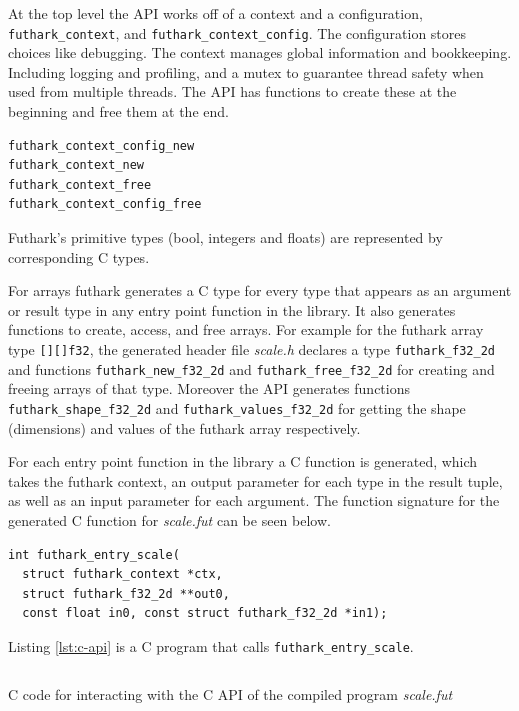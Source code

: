 \documentclass[11pt]{book}
\begin{document}
At the top level the API works off of a context and a configuration, \texttt{futhark\_context}, and \texttt{futhark\_context\_config}. The configuration stores choices like debugging. The context manages global information and bookkeeping. Including logging and profiling, and a mutex to guarantee thread safety when used from multiple threads. The API has functions to create these at the beginning and free them at the end. 
\begin{verbatim}
futhark_context_config_new
futhark_context_new
futhark_context_free
futhark_context_config_free
\end{verbatim}

Futhark's primitive types (bool, integers and floats) are represented by corresponding C types.

For arrays futhark generates a C type for every type that appears as an argument or result type in any entry point function in the library. It also generates functions to create, access, and free arrays. For example for the futhark array type \texttt{[][]f32}, the generated header file \textit{scale.h} declares a type \texttt{futhark\_f32\_2d} and functions \texttt{futhark\_new\_f32\_2d} and \texttt{futhark\_free\_f32\_2d} for creating and freeing arrays of that type. Moreover the API generates functions \texttt{futhark\_shape\_f32\_2d} and \texttt{futhark\_values\_f32\_2d} for getting the shape (dimensions) and values of the futhark array respectively. 

For each entry point function in the library a C function is generated, which takes the futhark context, an output parameter for each type in the result tuple, as well as an input parameter for each argument. The function signature for the generated C function for \textit{scale.fut} can be seen below.
\begin{verbatim}
int futhark_entry_scale(
  struct futhark_context *ctx,
  struct futhark_f32_2d **out0,
  const float in0, const struct futhark_f32_2d *in1);
\end{verbatim}

Listing \ref{lst:c-api} is a C program that calls \texttt{futhark\_entry\_scale}. 

\begin{listing}[h!] 
\inputminted[fontsize=\small,baselinestretch=0.5,linenos]{C}{code/compiler/api_examples/example.c}
\caption{C code for interacting with the C API of the compiled program \textit{scale.fut} }
\label{lst:c-api}    
\end{listing} 
\end{document}
